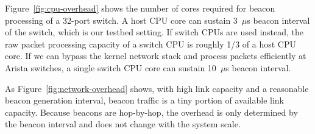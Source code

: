 Figure~\ref{fig:cpu-overhead} shows the number of cores required for beacon processing of a 32-port switch.
A host CPU core can sustain 3~$\mu$s beacon interval of the switch, which is our testbed setting.
If switch CPUs are used instead, the raw packet processing capacity of a switch CPU is roughly 1/3 of a host CPU core.
If we can bypass the kernel network stack and process packets efficiently at Arista switches, a single switch CPU core can sustain 10~$\mu$s beacon interval.


As Figure~\ref{fig:network-overhead} shows, with high link capacity and a reasonable beacon generation interval, beacon traffic is a tiny portion of available link capacity. Because beacons are hop-by-hop, the overhead is only determined by the beacon interval and does not change with the system scale.

